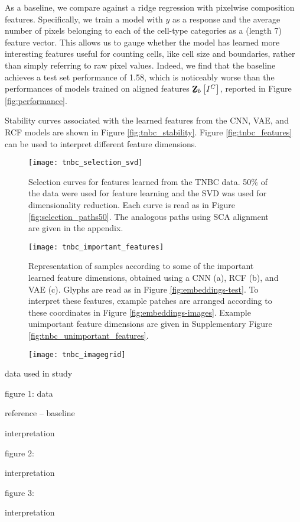 As a baseline, we compare against a ridge regression with pixelwise composition
features. Specifically, we train a model with $y$ as a response and the average
number of pixels belonging to each of the cell-type categories as a (length 7)
feature vector. This allows us to gauge whether the model has learned more
interesting features useful for counting cells, like cell size and boundaries,
rather than simply referring to raw pixel values. Indeed, we find that the
baseline achieves a test set performance of 1.58, which is noticeably worse than
the performances of models trained on aligned features
$\underaccent{\bar}{\mathbf{Z}}_{b}\left[I^{C}\right]$, reported in Figure
\ref{fig:performance}.

Stability curves associated with the learned features from the CNN, VAE, and RCF
models are shown in Figure \ref{fig:tnbc_stability}. Figure
\ref{fig:tnbc_features} can be used to interpret different feature dimensions.

\begin{figure}
  \centering
  \texttt{[image: tnbc\_selection\_svd]}
  \caption{Selection curves for features learned from the TNBC data. 50\% of
    the data were used for feature learning and the SVD was used for
    dimensionality reduction. Each curve is read as in Figure
    \ref{fig:selection_paths50}. The analogous paths using SCA alignment are
    given in the appendix. }
  \label{fig:tnbc_selection_svd}
\end{figure}

\begin{figure}
  \centering
  \texttt{[image: tnbc\_important\_features]}
  \caption{Representation of samples according to some of the important learned
    feature dimensions, obtained using a CNN (a), RCF (b), and VAE (c). Glyphs
    are read as in Figure \ref{fig:embeddings-test}. To interpret these
    features, example patches are arranged according to these coordinates in
    Figure \ref{fig:embeddings-images}. Example unimportant feature dimensions
    are given in Supplementary Figure \ref{fig:tnbc_unimportant_features}.}
  \label{fig:tnbc_important_features}
\end{figure}

\begin{figure}
  \centering
  \texttt{[image: tnbc\_imagegrid]}
  \caption{}
  \label{fig:tnbc_important_features}
\end{figure}

data used in study

figure 1: data

reference -- baseline

interpretation

figure 2:

interpretation

figure 3:

interpretation
